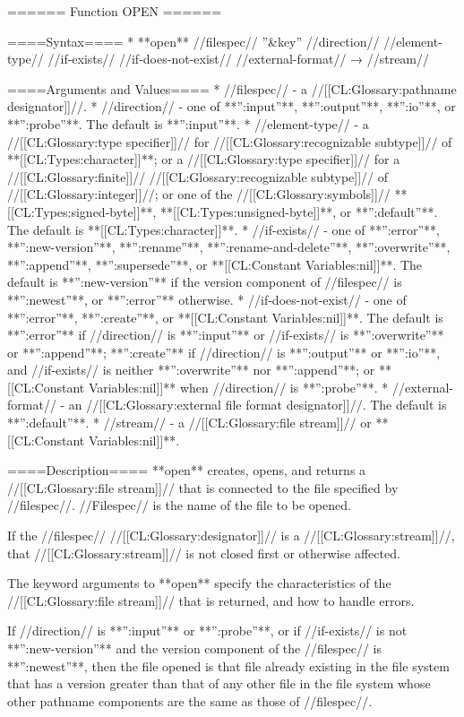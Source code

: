====== Function OPEN ======

====Syntax====
  * **open** //filespec// ''&key'' //direction// //element-type// //if-exists// //if-does-not-exist// //external-format// → //stream//

====Arguments and Values====
  * //filespec// - a //[[CL:Glossary:pathname designator]]//.
  * //direction// - one of **'':input''**, **'':output''**, **'':io''**, or **'':probe''**. The default is **'':input''**.
  * //element-type// - a //[[CL:Glossary:type specifier]]// for //[[CL:Glossary:recognizable subtype]]// of **[[CL:Types:character]]**; or a //[[CL:Glossary:type specifier]]// for a //[[CL:Glossary:finite]]// //[[CL:Glossary:recognizable subtype]]// of //[[CL:Glossary:integer]]//; or one of the //[[CL:Glossary:symbols]]// **[[CL:Types:signed-byte]]**, **[[CL:Types:unsigned-byte]]**, or **'':default''**. The default is **[[CL:Types:character]]**.
  * //if-exists// - one of **'':error''**, **'':new-version''**, **'':rename''**, **'':rename-and-delete''**, **'':overwrite''**, **'':append''**, **'':supersede''**, or **[[CL:Constant Variables:nil]]**. The default is **'':new-version''** if the version component of //filespec// is **'':newest''**, or **'':error''** otherwise.
  * //if-does-not-exist// - one of **'':error''**, **'':create''**, or **[[CL:Constant Variables:nil]]**. The default is **'':error''** if //direction// is **'':input''** or //if-exists// is **'':overwrite''** or **'':append''**; **'':create''** if //direction// is **'':output''** or **'':io''**, and //if-exists// is neither **'':overwrite''** nor **'':append''**; or **[[CL:Constant Variables:nil]]** when //direction// is **'':probe''**.
  * //external-format// - an //[[CL:Glossary:external file format designator]]//. The default is **'':default''**.
  * //stream// - a //[[CL:Glossary:file stream]]// or **[[CL:Constant Variables:nil]]**.

====Description====
**open** creates, opens, and returns a //[[CL:Glossary:file stream]]// that is connected to the file specified by //filespec//. //Filespec// is the name of the file to be opened.

If the //filespec// //[[CL:Glossary:designator]]// is a //[[CL:Glossary:stream]]//, that //[[CL:Glossary:stream]]// is not closed first or otherwise affected.

The keyword arguments to **open** specify the characteristics of the //[[CL:Glossary:file stream]]// that is returned, and how to handle errors.

If //direction// is **'':input''** or **'':probe''**, or if //if-exists// is not **'':new-version''** and the version component of the //filespec// is **'':newest''**, then the file opened is that file already existing in the file system that has a version greater than that of any other file in the file system whose other pathname components are the same as those of //filespec//.

